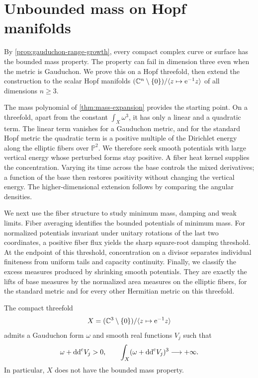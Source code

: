 \chapter{Unbounded mass on Hopf manifolds}
\label{chap:hopf}

By \cref{prop:gauduchon-range-growth}, every compact complex curve or surface has the bounded mass property. The property can fail in dimension three even when the metric is Gauduchon. We prove this on a Hopf threefold, then extend the construction to the scalar Hopf manifolds $(\mathbb C^n\setminus\{0\})/\langle z\mapsto\mathrm{e}^{-1}z\rangle$ of all dimensions $n\geq3$.

The mass polynomial of \cref{thm:mass-expansion} provides the starting point. On a threefold, apart from the constant $\int_X\omega^3$, it has only a linear and a quadratic term. The linear term vanishes for a Gauduchon metric, and for the standard Hopf metric the quadratic term is a positive multiple of the Dirichlet energy along the elliptic fibers over $\mathbb P^2$. We therefore seek smooth potentials with large vertical energy whose perturbed forms stay positive. A fiber heat kernel supplies the concentration. Varying its time across the base controls the mixed derivatives; a function of the base then restores positivity without changing the vertical energy. The higher-dimensional extension follows by comparing the angular densities.

We next use the fiber structure to study minimum mass, damping and weak limits. Fiber averaging identifies the bounded potentials of minimum mass. For normalized potentials invariant under unitary rotations of the last two coordinates, a positive fiber flux yields the sharp square-root damping threshold. At the endpoint of this threshold, concentration on a divisor separates individual finiteness from uniform tails and capacity continuity. Finally, we classify the excess measures produced by shrinking smooth potentials. They are exactly the lifts of base measures by the normalized area measures on the elliptic fibers, for the standard metric and for every other Hermitian metric on this threefold.

\begin{theorem}\label{thm:hopf-unbounded}
The compact threefold
\[
 X=(\mathbb C^3\setminus\{0\})/\langle z\mapsto \mathrm{e}^{-1}z\rangle
\]
admits a Gauduchon form $\omega$ and smooth real functions $V_j$ such that
\[
 \omega+\mathrm{dd}^{\mathrm{c}} V_j>0,\qquad
 \int_X(\omega+\mathrm{dd}^{\mathrm{c}} V_j)^3\longrightarrow+\infty.
\]
In particular, $X$ does not have the bounded mass property.
\end{theorem}

